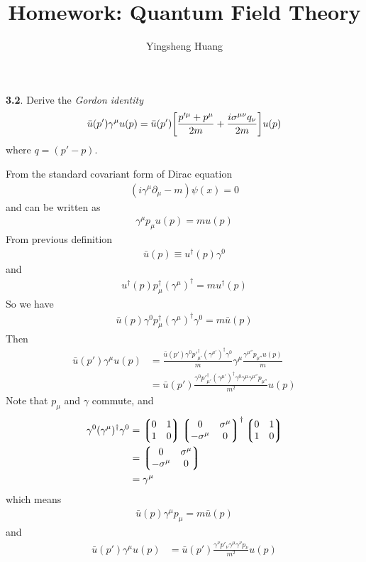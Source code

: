 \documentclass{article}
\title{Homework: Quantum Field Theory}
\author{Yingsheng Huang}
\begin{document}
\maketitle









{\bf{3.2}}. Derive the \emph{Gordon identity}
\begin{align}\label{40}
  \bar{u}(p')\gamma^{\mu}u(p)=\bar{u}(p')\bqty{\frac{p'^{\mu}+p^{\mu}}{2m}+\frac{i\sigma^{\mu\nu}q_{\nu}}{2m}}u(p)
\end{align}
where $q=(p'-p)$.

From the standard covariant form of Dirac equation
\begin{align*}
  (i\gamma^{\mu}\partial_{\mu}-m)\psi(x)=0
\end{align*}
and can be written as
\begin{align}
  \gamma^{\mu}p_{\mu}u(p)=m u(p)
\end{align}
From previous definition
\begin{align*}
  \bar{u}(p)\equiv u^{\dagger}(p)\gamma^0
\end{align*}
and
\begin{align*}
  u^{\dagger}(p)p_{\mu}^{\dagger}(\gamma^{\mu})^{\dagger}=m u^{\dagger}(p)
\end{align*}
So we have
\begin{align*}
  \bar{u}(p)\gamma^0p_{\mu}^{\dagger}(\gamma^{\mu})^{\dagger}\gamma^0=m \bar{u}(p)
\end{align*}
Then
\begin{align*}
  \bar{u}(p')\gamma^{\mu}u(p)&=\frac{\bar{u}(p')\gamma^0p'_{\mu'}^{\dagger}(\gamma^{\mu'})^{\dagger}\gamma^0}{m}\gamma^{\mu}\frac{\gamma^{\mu''}p_{\mu''}u(p)}{m}\\
  &=\bar{u}(p')\frac{\gamma^0p'_{\mu'}^{\dagger}(\gamma^{\mu'})^{\dagger}\gamma^0\gamma^{\mu}\gamma^{\mu''}p_{\mu''}}{m^2}u(p)
\end{align*}
Note that $p_{\mu}$ and $\gamma$ commute, and
\begin{align*}
  \gamma^0(\gamma^{\mu})^{\dagger}\gamma^0&=\Pmqty{0&1\\1&0}\Pmqty{0&\sigma^{\mu}\\-\sigma^{\mu}&0}^{\dagger}\Pmqty{0&1\\1&0}\\
  &=\Pmqty{0&\sigma^{\mu}\\-\sigma^{\mu}&0}\\&=
  \gamma^{\mu}
\end{align*}
which means
\begin{align*}
  \bar{u}(p)\gamma^{\mu}p_{\mu}=m \bar{u}(p)
\end{align*}
and
\begin{align*}
  \bar{u}(p')\gamma^{\mu}u(p)&=\bar{u}(p')\frac{\gamma^{\nu}p'_{\nu}\gamma^{\mu}\gamma^{\nu}p_{\nu}}{m^2}u(p)
\end{align*}
\end{document}
